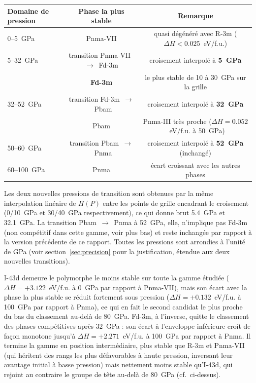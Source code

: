 \documentclass[11pt,a4paper]{article}
\begin{document}
\begin{center}
\begin{tabular}{lcc}
\toprule
Domaine de pression & Phase la plus stable & Remarque \\
\midrule
0--5~GPa    & Pnma-VII & quasi dégénéré avec R-3m ($\Delta H < 0.025$~eV/f.u.) \\
5--32~GPa   & transition Pnma-VII~$\to$~Fd-3m & croisement interpolé à \textbf{5~GPa} \\
            & \textbf{Fd-3m} & le plus stable de 10 à 30~GPa sur la grille \\
32--52~GPa  & transition Fd-3m~$\to$~Pbam & croisement interpolé à \textbf{32~GPa} \\
            & Pbam & Pnma-III très proche ($\Delta H = 0.052$~eV/f.u. à 50~GPa) \\
50--60~GPa  & transition Pbam~$\to$~Pnma & croisement interpolé à \textbf{52~GPa} (inchangé) \\
60--100~GPa & Pnma & écart croissant avec les autres phases \\
\bottomrule
\end{tabular}
\end{center}

Les deux nouvelles pressions de transition sont obtenues par la même interpolation linéaire de
$H(P)$ entre les points de grille encadrant le croisement (0/10~GPa et 30/40~GPa
respectivement), ce qui donne brut 5.4~GPa et 32.1~GPa. La transition Pbam~$\to$~Pnma à 52~GPa,
elle, n'implique pas Fd-3m (non compétitif dans cette gamme, voir plus bas) et reste inchangée
par rapport à la version précédente de ce rapport. Toutes les pressions sont arrondies à
l'unité de GPa (voir section~\ref{sec:precision} pour la justification, étendue aux deux
nouvelles transitions).

I-43d demeure le polymorphe le moins stable sur toute la gamme étudiée
($\Delta H = +3.122$~eV/f.u. à 0~GPa par rapport à Pnma-VII), mais son écart avec la phase la
plus stable se réduit fortement sous pression ($\Delta H = +0.132$~eV/f.u. à 100~GPa par rapport
à Pnma), ce qui en fait le second candidat le plus proche du bas du classement au-delà de
80~GPa. Fd-3m, à l'inverse, quitte le classement des phases compétitives après 32~GPa : son
écart à l'enveloppe inférieure croît de façon monotone jusqu'à $\Delta H = +2.271$~eV/f.u. à
100~GPa par rapport à Pnma. Il termine la gamme en position intermédiaire, plus stable que
R-3m et Pnma-VII (qui héritent des rangs les plus défavorables à haute pression, inversant leur
avantage initial à basse pression) mais nettement moins stable qu'I-43d, qui rejoint au
contraire le groupe de tête au-delà de 80~GPa (cf.\ ci-dessus).
\end{document}
